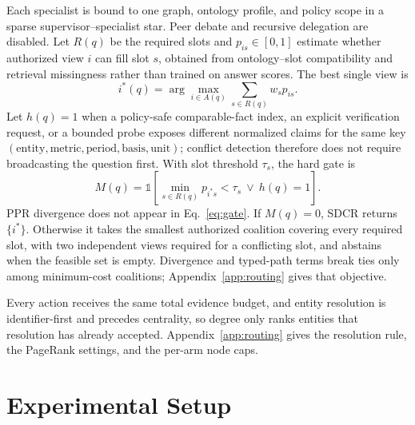 \documentclass{article}
\begin{document}
Each specialist is bound to one graph, ontology profile, and policy scope in a sparse supervisor--specialist star. Peer debate and recursive delegation are disabled. Let $R(q)$ be the required slots and $p_{is}\in[0,1]$ estimate whether authorized view $i$ can fill slot $s$, obtained from ontology--slot compatibility and retrieval missingness rather than trained on answer scores. The best single view is
\begin{equation}
i^*(q)=\arg\max_{i\in A(q)}\sum_{s\in R(q)}w_s p_{is}.
\end{equation}
Let $h(q)=1$ when a policy-safe comparable-fact index, an explicit verification request, or a bounded probe exposes different normalized claims for the same key $(\text{entity},\text{metric},\text{period},\text{basis},\text{unit})$; conflict detection therefore does not require broadcasting the question first. With slot threshold $\tau_s$, the hard gate is
\begin{equation}
M(q)=\mathbb{1}\!\left[\min_{s\in R(q)}p_{i^*s}<\tau_s\ \lor\ h(q)=1\right].
\label{eq:gate}
\end{equation}
PPR divergence does not appear in Eq.~\ref{eq:gate}. If $M(q)=0$, SDCR returns $\{i^*\}$. Otherwise it takes the smallest authorized coalition covering every required slot, with two independent views required for a conflicting slot, and abstains when the feasible set is empty. Divergence and typed-path terms break ties only among minimum-cost coalitions; Appendix~\ref{app:routing} gives that objective.

Every action receives the same total evidence budget, and entity resolution is identifier-first and precedes centrality, so degree only ranks entities that resolution has already accepted. Appendix~\ref{app:routing} gives the resolution rule, the PageRank settings, and the per-arm node caps.

\section{Experimental Setup}
\label{sec:setup}
\end{document}

